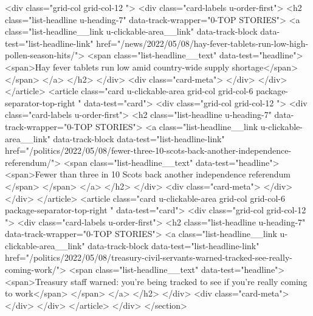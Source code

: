 {{{<div class="grid-col grid-col-12  ">
<div class="card-labels u-order-first">
<h2 class="list-headline  u-heading-7" data-track-wrapper="0-TOP STORIES">
<a class="list-headline__link u-clickable-area__link" data-track-block data-test="list-headline-link" href="/news/2022/05/08/hay-fever-tablets-run-low-high-pollen-season-hits/">
<span class="list-headline__text" data-test="headline">
<span>Hay fever tablets run low amid country-wide supply shortage</span>
</span>
</a>
</h2>
</div>
<div class="card-meta">
</div>
</div>
</article>
<article class="card u-clickable-area grid-col grid-col-6 package-separator-top-right " data-test="card">
<div class="grid-col grid-col-12  ">
<div class="card-labels u-order-first">
<h2 class="list-headline  u-heading-7" data-track-wrapper="0-TOP STORIES">
<a class="list-headline__link u-clickable-area__link" data-track-block data-test="list-headline-link" href="/politics/2022/05/08/fewer-three-10-scots-back-another-independence-referendum/">
<span class="list-headline__text" data-test="headline">
<span>Fewer than three in 10 Scots back another independence referendum </span>
</span>
</a>
</h2>
</div>
<div class="card-meta">
</div>
</div>
</article>
<article class="card u-clickable-area grid-col grid-col-6 package-separator-top-right " data-test="card">
<div class="grid-col grid-col-12  ">
<div class="card-labels u-order-first">
<h2 class="list-headline  u-heading-7" data-track-wrapper="0-TOP STORIES">
<a class="list-headline__link u-clickable-area__link" data-track-block data-test="list-headline-link" href="/politics/2022/05/08/treasury-civil-servants-warned-tracked-see-really-coming-work/">
<span class="list-headline__text" data-test="headline">
<span>Treasury staff warned: you’re being tracked to see if you’re really coming to work</span>
</span>
</a>
</h2>
</div>
<div class="card-meta">
</div>
</div>
</article>
</div>
</section>

	
		
			
		
}}}
